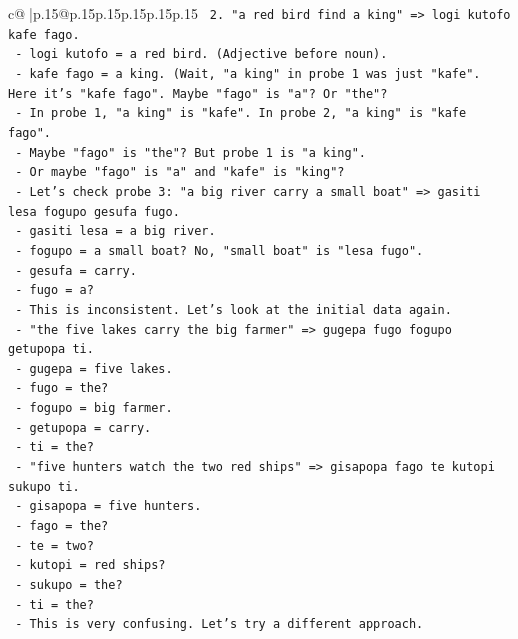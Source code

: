\documentclass{article}
\begin{document}
{\begin{supertabular}{c@{$\;$}|p{.15\linewidth}@{}p{.15\linewidth}p{.15\linewidth}p{.15\linewidth}p{.15\linewidth}p{.15\linewidth}}
{{{\texttt{  2. "a red bird find a king" => logi kutofo kafe fago.} \\
\texttt{     {-} logi kutofo = a red bird. (Adjective before noun).} \\
\texttt{     {-} kafe fago = a king. (Wait, "a king" in probe 1 was just "kafe". Here it's "kafe fago". Maybe "fago" is "a"? Or "the"?} \\
\texttt{     {-} In probe 1, "a king" is "kafe". In probe 2, "a king" is "kafe fago".} \\
\texttt{     {-} Maybe "fago" is "the"? But probe 1 is "a king".} \\
\texttt{     {-} Or maybe "fago" is "a" and "kafe" is "king"?} \\
\texttt{     {-} Let's check probe 3: "a big river carry a small boat" => gasiti lesa fogupo gesufa fugo.} \\
\texttt{       {-} gasiti lesa = a big river.} \\
\texttt{       {-} fogupo = a small boat? No, "small boat" is "lesa fugo".} \\
\texttt{       {-} gesufa = carry.} \\
\texttt{       {-} fugo = a?} \\
\texttt{     {-} This is inconsistent. Let's look at the initial data again.} \\
\texttt{     {-} "the five lakes carry the big farmer" => gugepa fugo fogupo getupopa ti.} \\
\texttt{       {-} gugepa = five lakes.} \\
\texttt{       {-} fugo = the?} \\
\texttt{       {-} fogupo = big farmer.} \\
\texttt{       {-} getupopa = carry.} \\
\texttt{       {-} ti = the?} \\
\texttt{     {-} "five hunters watch the two red ships" => gisapopa fago te kutopi sukupo ti.} \\
\texttt{       {-} gisapopa = five hunters.} \\
\texttt{       {-} fago = the?} \\
\texttt{       {-} te = two?} \\
\texttt{       {-} kutopi = red ships?} \\
\texttt{       {-} sukupo = the?} \\
\texttt{       {-} ti = the?} \\
\texttt{     {-} This is very confusing. Let's try a different approach.} \\
}}}
\end{supertabular}}
\end{document}
